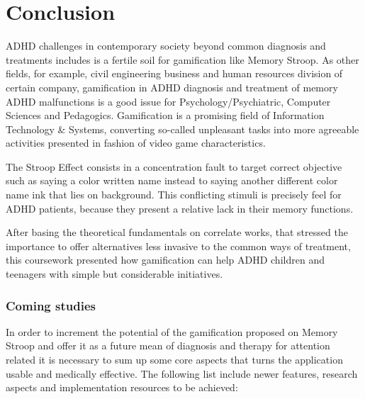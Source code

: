 \chapter{Conclusion}
\label{ch:conclusion}

ADHD challenges in contemporary society beyond common diagnosis and treatments includes is a fertile soil for gamification like Memory Stroop. As other fields, for example, civil engineering business and human resources division of certain company, gamification in ADHD diagnosis and treatment of memory ADHD malfunctions is a good issue for Psychology/Psychiatric, Computer Sciences and Pedagogics. Gamification is a promising field of Information Technology \& Systems, converting so-called unpleasant tasks into more agreeable activities presented in fashion of video game characteristics.

The Stroop Effect consists in a concentration fault to target correct objective such as saying a color written name instead to saying another different color name ink that lies on background. This conflicting stimuli is precisely feel for ADHD patients, because they present a relative lack in their memory functions.

After basing the theoretical fundamentals on correlate works, that stressed the importance to offer alternatives less invasive to the common ways of treatment, this coursework presented how gamification can help ADHD children and teenagers with simple but considerable initiatives.

\subsection{Coming studies}

In order to increment the potential of the gamification proposed on Memory Stroop and offer it as a future mean of diagnosis and therapy for attention related it is necessary to sum up some core aspects that turns the application usable and medically effective. The following list include newer features, research aspects and implementation resources to be achieved:

